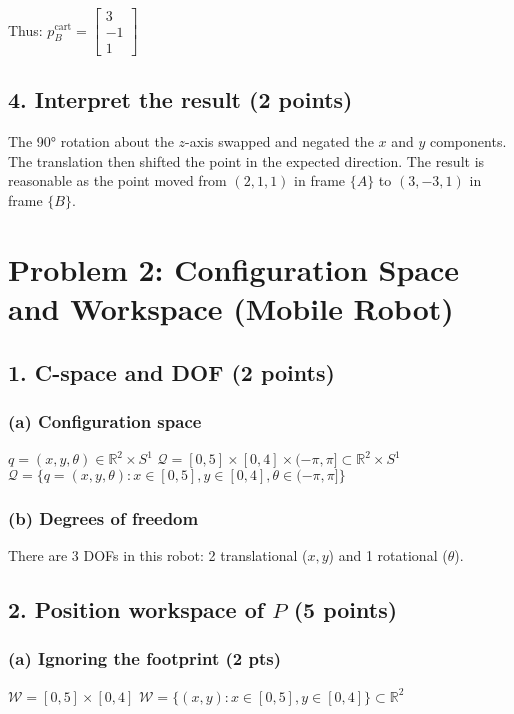 \documentclass[11pt]{article}
\begin{document}
Thus: $p_B^{\text{cart}} = \begin{bmatrix} 3 \\ -1 \\ 1 \end{bmatrix}$

\subsection*{4. Interpret the result (2 points)}
The 90° rotation about the $z$-axis swapped and negated the $x$ and $y$ components. The translation then shifted the point in the expected direction. The result is reasonable as the point moved from $(2,1,1)$ in frame $\{A\}$ to $(3,-3,1)$ in frame $\{B\}$.

\section*{Problem 2: Configuration Space and Workspace (Mobile Robot)}

\subsection*{1. C-space and DOF (2 points)}
\subsubsection*{(a) Configuration space}
$q = (x, y, \theta) \in \mathbb{R}^2 \times S^1$
$\mathcal{Q} = [0, 5] \times [0, 4] \times (-\pi, \pi] \subset \mathbb{R}^2 \times S^1$
$\mathcal{Q} = \{q = (x, y, \theta) : x \in [0, 5], y \in [0, 4], \theta \in (-\pi, \pi]\}$

\subsubsection*{(b) Degrees of freedom}
There are 3 DOFs in this robot: 2 translational ($x, y$) and 1 rotational ($\theta$).

\subsection*{2. Position workspace of $P$ (5 points)}
\subsubsection*{(a) Ignoring the footprint (2 pts)}
$\mathcal{W} = [0, 5] \times [0, 4]$
$\mathcal{W} = \{(x, y) : x \in [0, 5], y \in [0, 4]\} \subset \mathbb{R}^2$
\end{document}
